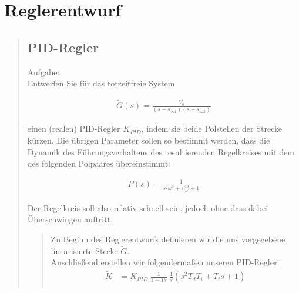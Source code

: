 \section{Reglerentwurf}
\begin{quote}
	\hspace{-2em}
	\subsection{PID-Regler}
	\label{aufg:3.1}
	
	Aufgabe:\\
	Entwerfen Sie für das totzeitfreie System
	
	\begin{equation*}
    	\begin{split}
    		\tilde{G}(s) = \frac{V_0}{(s-s_{\infty 1})(s-s_{\infty 2})}
    	\end{split}
    \end{equation*}
	
	einen (realen) PID-Regler $K_{PID}$, indem sie beide Polstellen der Strecke kürzen. Die übrigen Parameter sollen so
	bestimmt werden, dass die Dynamik des Führungsverhaltens des resultierenden Regelkreises mit dem des folgenden Polpaares übereinstimmt:
	
	\begin{equation*}
    	\begin{split}
    		P(s) = \frac{1}{s^2 \omega^2 + s \frac{2 d}{\omega} + 1}
    	\end{split}
    \end{equation*}
	
	Der Regelkreis soll also relativ schnell sein, jedoch ohne dass dabei Überschwingen auftritt.\vspace{3em}
	
    \begin{quote}
        
        Zu Beginn des Reglerentwurfs definieren wir die uns vorgegebene linearisierte Stecke $\tilde{G}$.\\
        Anschließend erstellen wir folgendermaßen unseren PID-Regler:
        \begin{equation*}
        	\begin{split}
        		\tilde{K} &= K_{PID} \  \frac{1}{1 + T s} \ \frac{1}{s} (s^2  T_d T_i + T_i s + 1)\\
        	\end{split}
        \end{equation*}
        

\end{quote}
\end{quote}
